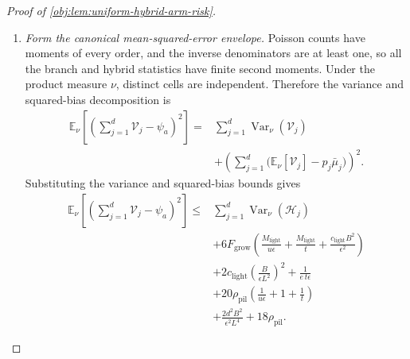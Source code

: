 \begin{proof}[Proof of \cref{obj:lem:uniform-hybrid-arm-risk}]
\begin{enumerate}
\item \textit{Form the canonical mean-squared-error envelope.}
Poisson counts have moments of every order, and the inverse denominators are at least one, so all the branch and hybrid statistics have finite second moments. Under the product measure \(\nu\), distinct cells are independent. Therefore the variance and squared-bias decomposition is
\[
\begin{aligned}
\mathbb E_\nu\left[
\left(\sum_{j=1}^d\mathcal V_j-\psi_a\right)^2
\right]
={}&
\sum_{j=1}^d\operatorname{Var}_\nu(\mathcal V_j)\\
&+
\left(
\sum_{j=1}^d
\bigl(\mathbb E_\nu[\mathcal V_j]-p_j\bar\mu_j\bigr)
\right)^2.
\end{aligned}
\]
Substituting the variance and squared-bias bounds gives
\[
\begin{aligned}
\mathbb E_\nu\left[
\left(\sum_{j=1}^d\mathcal V_j-\psi_a\right)^2
\right]
\le{}&
\sum_{j=1}^d\operatorname{Var}_\nu(\mathcal H_j)\\
&+6F_{\mathrm{grow}}
\left(
\frac{M_{\mathrm{light}}}{u\epsilon}
+\frac{M_{\mathrm{light}}}{t}
+\frac{c_{\mathrm{light}}B^2}{\epsilon^2}
\right)\\
&+2c_{\mathrm{light}}
\left(\frac B{\epsilon L^2}\right)^2
+\frac1{e\,t\epsilon}\\
&+20\rho_{\mathrm{pil}}
\left(\frac1{u\epsilon}+1+\frac1t\right)\\
&+\frac{2d^2B^2}{\epsilon^2L^4}
+18\rho_{\mathrm{pil}}.
\end{aligned}
\]


\end{enumerate}
\end{proof}
